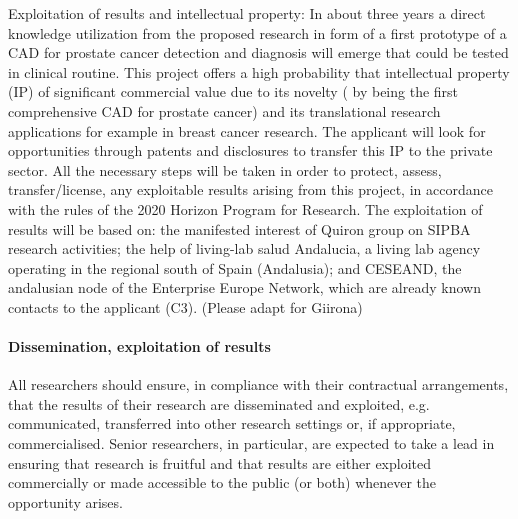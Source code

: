 Exploitation of results and intellectual property:  In about three years a direct knowledge utilization from the proposed research in form of a first prototype of a CAD for prostate cancer detection and diagnosis  will emerge that could be  tested in clinical routine. This project offers a high probability that intellectual property (IP) of significant commercial value due to its novelty  ( by being the first comprehensive CAD for prostate cancer) and its translational research applications for example in breast cancer research. The applicant will look for opportunities through patents and disclosures to transfer this IP to the private sector. All the necessary steps will be taken in order to protect, assess, transfer/license, any exploitable results arising from this project, in accordance with the rules of the 2020 Horizon Program for Research. The exploitation of results will be based on: the manifested interest of Quiron group on SIPBA research activities; the help of living-lab salud Andalucia, a living lab agency operating in the regional south of Spain (Andalusia); and CESEAND, the andalusian node of the Enterprise Europe Network, which are already known contacts to the applicant (C3). (Please adapt for Giirona)

\paragraph{Dissemination, exploitation of results}
All researchers should ensure, in compliance with their contractual arrangements, that the results of their research are disseminated and exploited, e.g. communicated, transferred into other research settings or, if appropriate, commercialised. Senior researchers, in particular, are expected to take a lead in ensuring that research is fruitful and that results are either exploited commercially or made accessible to the public (or both) whenever the opportunity arises. 
